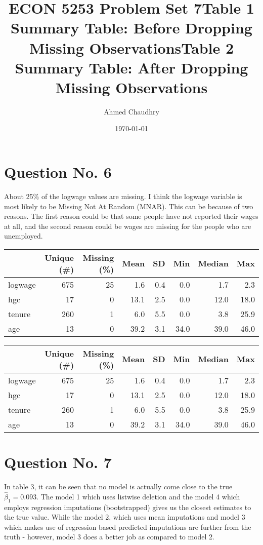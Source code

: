 \documentclass{article}
\title{ECON 5253 Problem Set 7}
\author{Ahmed Chaudhry}
\date{\today}
\begin{document}
\maketitle
\section{Question No. 6}
About 25\% of the logwage values are missing. I think the logwage variable is most likely to be Missing Not At Random (MNAR). This can be because of two reasons. The first reason could be that some people have not reported their wages at all, and the second reason could be wages are missing for the people who are unemployed.

\begin{table}[hbt!]
\centering
\title{Table 1 Summary Table: Before Dropping Missing Observations}
\begin{tabular}[t]{lrrrrrrr}
\toprule
  & Unique (\#) & Missing (\%) & Mean & SD & Min & Median & Max\\
\midrule
logwage & 675 & 25 & 1.6 & 0.4 & 0.0 & 1.7 & 2.3\\
hgc & 17 & 0 & 13.1 & 2.5 & 0.0 & 12.0 & 18.0\\
tenure & 260 & 1 & 6.0 & 5.5 & 0.0 & 3.8 & 25.9\\
age & 13 & 0 & 39.2 & 3.1 & 34.0 & 39.0 & 46.0\\
\bottomrule
\end{tabular}
\end{table}



\begin{table}[hbt!]
\centering
\title{Table 2 Summary Table: After Dropping Missing Observations}
\begin{tabular}[t]{lrrrrrrr}
\toprule
  & Unique (\#) & Missing (\%) & Mean & SD & Min & Median & Max\\
\midrule
logwage & 675 & 25 & 1.6 & 0.4 & 0.0 & 1.7 & 2.3\\
hgc & 17 & 0 & 13.1 & 2.5 & 0.0 & 12.0 & 18.0\\
tenure & 260 & 1 & 6.0 & 5.5 & 0.0 & 3.8 & 25.9\\
age & 13 & 0 & 39.2 & 3.1 & 34.0 & 39.0 & 46.0\\
\bottomrule
\end{tabular}
\end{table}

\newpage
\section{Question No. 7}
In table 3, it can be seen that no model is actually come close to the true $\hat{\beta}_1 = 0.093$. The model 1 which uses listwise deletion and the model 4 which employs regression imputations (bootstrapped) gives us the closest estimates to the true value. While the model 2, which uses mean imputations and model 3 which makes use of regression based predicted imputations are further from the truth - however, model 3 does a better job as compared to model 2.
\end{document}
